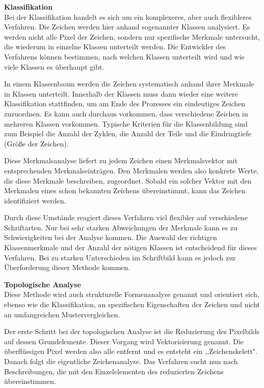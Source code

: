 \newpage

\textbf{Klassifikation}\\
Bei der Klassifikation handelt es sich um ein komplexeres, aber auch flexibleres Verfahren. Die Zeichen werden hier anhand sogenannter Klassen analysiert. Es werden nicht alle Pixel der Zeichen, sondern nur spezifische Merkmale untersucht, die wiederum in einzelne Klassen unterteilt werden. Die Entwickler des Verfahrens können bestimmen, nach welchen Klassen unterteilt wird und wie viele Klassen es überhaupt gibt. \cite{OCRB}


In einem Klassenbaum werden die Zeichen systematisch anhand ihrer Merkmale in Klassen unterteilt. Innerhalb der Klassen muss dann wieder eine weitere Klassifikation stattfinden, um am Ende des Prozesses ein eindeutiges Zeichen zuzuordnen. Es kann auch durchaus vorkommen, dass verschiedene Zeichen in mehreren Klassen vorkommen. Typische Kriterien für die Klassenbildung sind zum Beispiel die Anzahl der Zyklen, die Anzahl der Teile und die Eindringtiefe (Größe der Zeichen). \cite{OCRB}

Diese Merkmalsanalyse liefert zu jedem Zeichen einen Merkmalsvektor mit entsprechenden Merkmalseinträgen. Den Merkmalen werden also konkrete Werte, die diese Merkmale beschreiben, zugeordnet. Sobald ein solcher Vektor mit den Merkmalen eines schon bekannten Zeichens übereinstimmt, kann das Zeichen identifiziert werden. \cite{OCRB}

\newpage

Durch diese Umstände reagiert dieses Verfahren viel flexibler auf verschiedene Schriftarten. Nur bei sehr starken Abweichungen der Merkmale kann es zu Schwierigkeiten bei der Analyse kommen. Die Auswahl der richtigen Klassenmerkmale und der Anzahl der nötigen Klassen ist entscheidend für dieses Verfahren. Bei zu starken Unterschieden im Schriftbild kann es jedoch zur Überforderung dieser Methode kommen. \cite{OCRB}

\textbf{Topologische Analyse}\\
Diese Methode wird auch strukturelle Formenanalyse genannt und orientiert sich, ebenso wie die Klassifikation, an spezifischen Eigenschaften der Zeichen und nicht an umfangreichen Mustervergleichen. \cite{OCRB,OCRE}

Der erste Schritt bei der topologischen Analyse ist die Reduzierung des Pixelbilds auf dessen Grundelemente. Dieser Vorgang wird Vektorisierung genannt. Die überflüssigen Pixel werden also alle entfernt und es entsteht ein ,,Zeichenskelett". Danach folgt die eigentliche Zeichenanalyse. Das Verfahren sucht nun nach Beschreibungen, die mit den Einzelelementen des reduzierten Zeichens übereinstimmen. \cite{OCRB}

